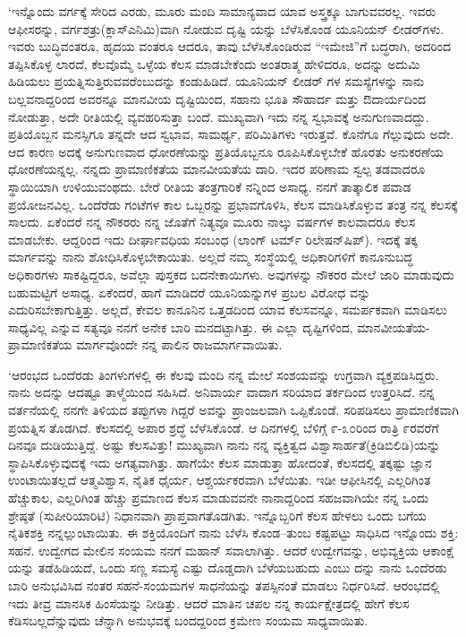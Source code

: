 ‘ಇನ್ನೊಂದು ವರ್ಗಕ್ಕೆ ಸೇರಿದ ಎರಡು, ಮೂರು ಮಂದಿ ಸಾಮಾನ್ಯವಾದ ಯಾವ ಅಸ್ತ್ರಕ್ಕೂ ಬಾಗುವವರಲ್ಲ. ಇವರು ಆಫೀಸರನ್ನು, ವರ್ಗಶತ್ರು(ಕ್ಲಾಸ್​ಎನಿಮಿ)ವಾಗಿ ನೋಡುವ ದೃಷ್ಟಿ ಯನ್ನು ಬೆಳೆಸಿಕೊಂಡ ಯೂನಿಯನ್ ಲೀಡರ್​ಗಳು. ಇವರು ಬುದ್ಧಿವಂತರೂ, ಹೃದಯ ವಂತರೂ ಆದರೂ, ತಾವು ಬೆಳೆಸಿಕೊಂಡಿರುವ “ಇಮೇಜಿ”ಗೆ ಬದ್ಧರಾಗಿ, ಅದರಿಂದ ತಪ್ಪಿಸಿಕೊಳ್ಳ ಲಾರದೆ, ಕೆಲವೊಮ್ಮೆ ಒಳ್ಳೆಯ ಕೆಲಸ ಮಾಡಬೇಕೆಂದು ಅಂತರಾತ್ಮ ಹೇಳಿದರೂ, ಅದನ್ನು ಅದುಮಿ ಹಿಡಿಯಲು ಪ್ರಯತ್ನಿಸುತ್ತಿರುವವರೆಂಬುದನ್ನು ಕಂಡುಹಿಡಿದೆ. ಯೂನಿಯನ್ ಲೀಡರ್ ಗಳ ಸಮಸ್ಯೆಗಳನ್ನು ನಾನು ಬಲ್ಲವನಾದ್ದರಿಂದ ಅವರನ್ನೂ ಮಾನವೀಯ ದೃಷ್ಟಿಯಿಂದ, ಸಹಾನು ಭೂತಿ ಸೌಹಾರ್ದ ಮತ್ತು ಔದಾರ್ಯದಿಂದ ನೋಡುತ್ತಾ, ಅದೇ ರೀತಿಯಲ್ಲಿ ವ್ಯವಹರಿಸುತ್ತಾ ಬಂದೆ. ಮುಖ್ಯವಾಗಿ ಇದು ನನ್ನ ಸ್ವಭಾವಕ್ಕೆ ಅನುಗುಣವಾದದ್ದು. ಪ್ರತಿಯೊಬ್ಬನ ಮನಸ್ಸಿಗೂ ತನ್ನದೇ ಆದ ಸ್ವಭಾವ, ಸಾಮರ್ಥ್ಯ, ಪರಿಮಿತಿಗಳು ಇರುತ್ತವೆ. ಕೊನೆಗೂ ಗೆಲ್ಲುವುದು ಅದೇ. ಆದ ಕಾರಣ ಅದಕ್ಕೆ ಅನುಗುಣವಾದ ಧೋರಣೆಯನ್ನು ಪ್ರತಿಯೊಬ್ಬನೂ ರೂಪಿಸಿಕೊಳ್ಳಬೇಕೆ ಹೊರತು ಅನುಕರಣೆಯ ಧೋರಣೆಯನ್ನಲ್ಲ. ನನ್ನದು ಪ್ರಾಮಾಣಿಕತೆಯ ಮಾನವೀಯತೆಯ ದಾರಿ. ಇದರ ಪರಿಣಾಮ ಸ್ವಲ್ಪ ತಡವಾದರೂ ಸ್ಥಾಯಿಯಾಗಿ ಉಳಿಯುವಂಥದು. ಬೇರೆ ರೀತಿಯ ತಂತ್ರಗಾರಿಕೆ ನನ್ನಿಂದ ಅಸಾಧ್ಯ. ನನಗೆ ತಾತ್ಕಾಲಿಕ ಪವಾಡ ಪ್ರಯೋಜನವಿಲ್ಲ. ಒಂದೆರೆಡು ಗಂಟೆಗಳ ಕಾಲ ಒಬ್ಬರನ್ನು ಪ್ರಭಾವಗೊಳಿಸಿ, ಕೆಲಸ ಮಾಡಿಸಿಕೊಳ್ಳುವ ತಂತ್ರ ನನ್ನ ಕೆಲಸಕ್ಕೆ ಸಾಲದು. ಏಕೆಂದರೆ ನನ್ನ ನೌಕರರು ನನ್ನ ಜೊತೆಗೆ ನಿತ್ಯವೂ ಮೂರು ನಾಲ್ಕು ವರ್ಷಗಳ ಕಾಲವಾದರೂ ಕೆಲಸ ಮಾಡಬೇಕು. ಆದ್ದರಿಂದ ಇದು ದೀರ್ಘಾವಧಿಯ ಸಂಬಂಧ (ಲಾಂಗ್ ಟರ್ಮ್ ರಿಲೇಷನ್​ಷಿಪ್​). ಇದಕ್ಕೆ ತಕ್ಕ ಮಾರ್ಗವನ್ನು ನಾನು ಶೋಧಿಸಿಕೊಳ್ಳಬೇಕಾಯಿತು. ಅಲ್ಲದೆ ನಮ್ಮ ಸಂಸ್ಥೆಯಲ್ಲಿ ಅಧಿಕಾರಿಗಳಿಗೆ ಕಾನೂನುಬದ್ಧ ಅಧಿಕಾರಗಳು ಸಾಕಷ್ಟಿದ್ದರೂ, ಅವೆಲ್ಲಾ ಪುಸ್ತಕದ ಬದನೇಕಾಯಿಗಳು. ಅವುಗಳನ್ನು ನೌಕರರ ಮೇಲೆ ಜಾರಿ ಮಾಡುವುದು ಬಹುಮಟ್ಟಿಗೆ ಅಸಾಧ್ಯ. ಏಕೆಂದರೆ, ಹಾಗೆ ಮಾಡಿದರೆ ಯೂನಿಯನ್ನುಗಳ ಪ್ರಬಲ ವಿರೋಧ ವನ್ನು ಎದುರಿಸಬೇಕಾಗುತ್ತಿತ್ತು. ಅಲ್ಲದೆ, ಕೇವಲ ಕಾನೂನಿನ ಒತ್ತಡದಿಂದ ಯಾವ ಕೆಲಸವನ್ನೂ, ಸಮರ್ಪಕವಾಗಿ ಮಾಡಿಸಲು ಸಾಧ್ಯವಿಲ್ಲ ಎನ್ನುವ ಸತ್ಯವೂ ನನಗೆ ಅನೇಕ ಬಾರಿ ಮನದಟ್ಟಾಗಿತ್ತು. ಈ ಎಲ್ಲಾ ದೃಷ್ಟಿಗಳಿಂದ, ಮಾನವೀಯತೆಯ-ಪ್ರಾಮಾಣಿಕತೆಯ ಮಾರ್ಗವೊಂದೇ ನನ್ನ ಪಾಲಿನ ರಾಜಮಾರ್ಗವಾಯಿತು.

‘ಆರಂಭದ ಒಂದೆರಡು ತಿಂಗಳುಗಳಲ್ಲಿ ಈ ಕೆಲವು ಮಂದಿ ನನ್ನ ಮೇಲೆ ಸಂಶಯವನ್ನು ಉಗ್ರವಾಗಿ ವ್ಯಕ್ತಪಡಿಸಿದ್ದರು. ನಾನು ಅದನ್ನು ಆದಷ್ಟೂ ತಾಳ್ಮೆಯಿಂದ ಸಹಿಸಿದೆ. ಅನಿವಾರ್ಯ ವಾದಾಗ ಸರಿಯಾದ ತರ್ಕದಿಂದ ಉತ್ತರಿಸಿದೆ. ನನ್ನ ವರ್ತನೆಯಲ್ಲಿ ನನಗೇ ತಿಳಿಯದ ತಪ್ಪುಗಳಾ ಗಿದ್ದರೆ ಅವನ್ನು ಪ್ರಾಂಜಲವಾಗಿ ಒಪ್ಪಿಕೊಂಡೆ. ಸರಿಪಡಿಸಲು ಪ್ರಾಮಾಣಿಕವಾಗಿ ಪ್ರಯತ್ನಿಸ ತೊಡಗಿದೆ. ಕೆಲಸದಲ್ಲಿ ಅಪಾರ ಶ್ರದ್ಧೆ ಬೆಳೆಸಿಕೊಂಡೆ. ಆ ದಿನಗಳಲ್ಲಿ ಬೆಳಿಗ್ಗೆ ೯-೩೦ರಿಂದ ರಾತ್ರಿ ೯ರವರೆಗೆ ದಿನವೂ ದುಡಿಯುತ್ತಿದ್ದೆ. ಅಷ್ಟು ಕೆಲಸವಿತ್ತು! ಮುಖ್ಯವಾಗಿ ನಾನು ನನ್ನ ವ್ಯಕ್ತಿತ್ವದ ವಿಶ್ವಾಸಾರ್ಹತೆ(ಕ್ರಿಡಿಬಿಲಿಡಿ)ಯನ್ನು ಸ್ಥಾಪಿಸಿಕೊಳ್ಳುವುದಕ್ಕೆ ಇದು ಅಗತ್ಯವಾಗಿತ್ತು. ಹಾಗೆಯೇ ಕೆಲಸ ಮಾಡುತ್ತಾ ಹೋದಂತೆ, ಕೆಲಸದಲ್ಲಿ ತಕ್ಕಷ್ಟು ಜ್ಞಾನ ಉಂಟಾಯಿತಲ್ಲದೆ ಆತ್ಮವಿಶ್ವಾಸ, ನೈತಿಕ ಧೈರ್ಯ, ಆಶ್ಚರ್ಯಕರವಾಗಿ ಬೆಳೆಯಿತು. ಇಡೀ ಆಫೀಸಿನಲ್ಲಿ ಎಲ್ಲರಿಗಿಂತ ಹೆಚ್ಚುಕಾಲ, ಎಲ್ಲರಿಗಿಂತ ಹೆಚ್ಚು ಪ್ರಮಾಣದ ಕೆಲಸ ಮಾಡುವವನೇ ನಾನಾದ್ದರಿಂದ ಸಹಜವಾಗಿಯೇ ನನ್ನ ಒಂದು ಶ್ರೇಷ್ಠತೆ (ಸುಪೀರಿಯಾರಿಟಿ) ನಿಧಾನವಾಗಿ ಪ್ರಾಪ್ತವಾಗತೊಡಗಿತು. ಇನ್ನೊಬ್ಬರಿಗೆ ಕೆಲಸ ಹೇಳಲು ಒಂದು ಬಗೆಯ ನೈತಿಕಶಕ್ತಿ ನನ್ನಲ್ಲುಂಟಾಯಿತು. ಈ ಶಕ್ತಿಯೊಂದಿಗೆ ನಾನು ಬೆಳೆಸಿ ಕೊಂಡ–ತುಂಬ ಕಷ್ಟಪಟ್ಟು ಸಾಧಿಸಿದ ಇನ್ನೊಂದು ಶಕ್ತಿ: ಸಹನೆ. ಉದ್ವೇಗದ ಮೇಲಿನ ಸಂಯಮ ನನಗೆ ಮಹಾನ್ ಸವಾಲಾಗಿತ್ತು. ಆದರೆ ಉದ್ವೇಗವನ್ನು, ಅಭಿವ್ಯಕ್ತಿಯ ಆಕಾಂಕ್ಷೆ ಯನ್ನು ತಡೆಹಿಡಿಯದೆ, ಒಂದು ಸಣ್ಣ ಸಮಸ್ಯೆ ಎಷ್ಟು ದೊಡ್ಡದಾಗಿ ಬೆಳೆಯಬಹುದು ಎಂಬು ದನ್ನು ನಾನು ಒಂದೆರಡು ಬಾರಿ ಅನುಭವಿಸಿದ ನಂತರ ಸಹನೆ-ಸಂಯಮಗಳ ಸಾಧನೆಯನ್ನು ತಪಸ್ಸಿನಂತೆ ಮಾಡಲು ನಿರ್ಧರಿಸಿದೆ. ಆರಂಭದಲ್ಲಿ ಇದು ತೀವ್ರ ಮಾನಸಿಕ ಹಿಂಸೆಯನ್ನು ನೀಡಿತ್ತು. ಆದರೆ ಮಾತಿನ ಚಪಲ ನನ್ನ ಕಾರ್ಯಕ್ಷೇತ್ರದಲ್ಲಿ ಹೇಗೆ ಕೆಲಸ ಕೆಡಿಸಬಲ್ಲದೆನ್ನುವುದು ಚೆನ್ನಾಗಿ ಅನುಭವಕ್ಕೆ ಬಂದದ್ದರಿಂದ ಕ್ರಮೇಣ ಸಂಯಮ ಸಾಧ್ಯವಾಯಿತು.

